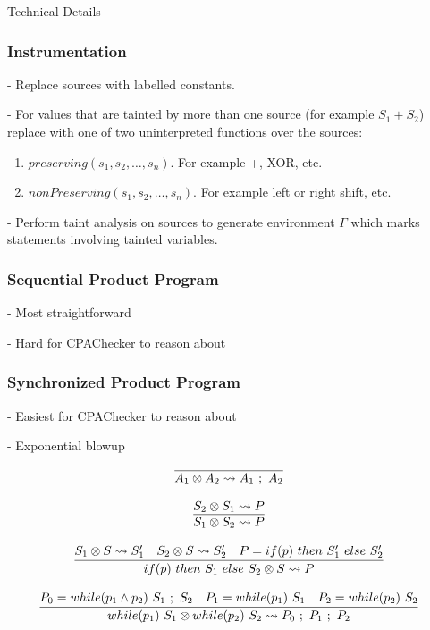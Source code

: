 \documentclass{beamer} %
\theoremstyle{definition} %
\newcommand{\cross}{\otimes{}}
\begin{document}
\begin{frame}
	Technical Details
\end{frame}




\begin{frame}
\frametitle{Instrumentation}
	
	- Replace sources with labelled constants.

	- For values that are tainted by more than one source (for example $S_1 + S_2$) replace with one of two uninterpreted functions over the sources: \begin{enumerate}
		\item $preserving(s_1, s_2, \ldots, s_n)$. For example +, XOR, etc.
		\item $nonPreserving(s_1, s_2, \ldots, s_n)$. For example left or right shift, etc.
	\end{enumerate}

	- Perform taint analysis on sources to generate environment $\Gamma$ which marks statements involving tainted variables. 

\end{frame}


\begin{frame}
\frametitle{Sequential Product Program}

	- Most straightforward

	- Hard for CPAChecker to reason about %
	
\end{frame}

\begin{frame}
\frametitle{Synchronized Product Program}

	- Easiest for CPAChecker to reason about

	- Exponential blowup

	\[
		\begin{array}{c}
			\infer[]{A_1 \cross A_2 \leadsto A_1\ ;\ A_2}{} \\ \\
			\infer[]{S_1 \cross S_2 \leadsto P}{
				S_2 \cross S_1 \leadsto P
			} \\ \\
			\infer[]{if(p)\ then\ S_1\ else\ S_2 \cross S \leadsto P}{
				\text{$S_1 \cross S \leadsto S_1'$} &
				\text{$S_2 \cross S \leadsto S_2'$} &
				\text{$P = if(p)\ then\ S_1'\ else\ S_2'$}
			} \\ \\
			\infer[]{while(p_1)\ S_1 \cross while(p_2)\ S_2 \leadsto P_0\ ;\ P_1\ ;\ P_2}{
				\text{$P_0 = while(p_1 \land p_2)\ S_1\ ;\ S_2$} &
				\text{$P_1 = while(p_1)\ S_1$} &
				\text{$P_2 = while(p_2)\ S_2$}
			}
		\end{array}
	\]
	
\end{frame}
\end{document}
